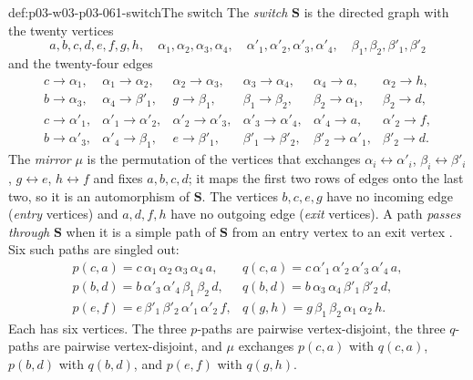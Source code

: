 \begin{hbdefinition}{def:p03-w03-p03-061-switch}{The switch}
The \emph{switch} \(\mathbf S\) is the directed graph with the twenty
vertices
\[
 a,b,c,d,e,f,g,h,\quad \alpha_1,\alpha_2,\alpha_3,\alpha_4,\quad
 \alpha'_1,\alpha'_2,\alpha'_3,\alpha'_4,\quad
 \beta_1,\beta_2,\beta'_1,\beta'_2
\]
and the twenty-four edges
\[
\begin{array}{llllll}
 c\to\alpha_1, & \alpha_1\to\alpha_2, & \alpha_2\to\alpha_3, &
 \alpha_3\to\alpha_4, & \alpha_4\to a, & \alpha_2\to h,\\
 b\to\alpha_3, & \alpha_4\to\beta'_1, & g\to\beta_1, &
 \beta_1\to\beta_2, & \beta_2\to\alpha_1, & \beta_2\to d,\\
 c\to\alpha'_1, & \alpha'_1\to\alpha'_2, & \alpha'_2\to\alpha'_3, &
 \alpha'_3\to\alpha'_4, & \alpha'_4\to a, & \alpha'_2\to f,\\
 b\to\alpha'_3, & \alpha'_4\to\beta_1, & e\to\beta'_1, &
 \beta'_1\to\beta'_2, & \beta'_2\to\alpha'_1, & \beta'_2\to d.
\end{array}
\]
The \emph{mirror} \(\mu\) is the permutation of the vertices that exchanges
\(\alpha_i\leftrightarrow\alpha'_i\), \(\beta_i\leftrightarrow\beta'_i\),
\(g\leftrightarrow e\), \(h\leftrightarrow f\) and fixes \(a,b,c,d\); it maps
the first two rows of edges onto the last two, so it is an automorphism of
\(\mathbf S\). The vertices \(b,c,e,g\) have no incoming edge (\emph{entry}
vertices) and \(a,d,f,h\) have no outgoing edge (\emph{exit} vertices). A
path \emph{passes through} \(\mathbf S\) when it is a simple path of
\(\mathbf S\) from an entry vertex to an exit vertex
\cite[p.~30]{KolaitisVardi1995DatalogManuscript}. Six such paths are
singled out:
\[
\begin{array}{ll}
 p(c,a)=c\,\alpha_1\,\alpha_2\,\alpha_3\,\alpha_4\,a, &
 q(c,a)=c\,\alpha'_1\,\alpha'_2\,\alpha'_3\,\alpha'_4\,a,\\
 p(b,d)=b\,\alpha'_3\,\alpha'_4\,\beta_1\,\beta_2\,d, &
 q(b,d)=b\,\alpha_3\,\alpha_4\,\beta'_1\,\beta'_2\,d,\\
 p(e,f)=e\,\beta'_1\,\beta'_2\,\alpha'_1\,\alpha'_2\,f, &
 q(g,h)=g\,\beta_1\,\beta_2\,\alpha_1\,\alpha_2\,h.
\end{array}
\]
Each has six vertices. The three \(p\)-paths are pairwise vertex-disjoint,
the three \(q\)-paths are pairwise vertex-disjoint, and \(\mu\) exchanges
\(p(c,a)\) with \(q(c,a)\), \(p(b,d)\) with \(q(b,d)\), and \(p(e,f)\) with
\(q(g,h)\).
\end{hbdefinition}

